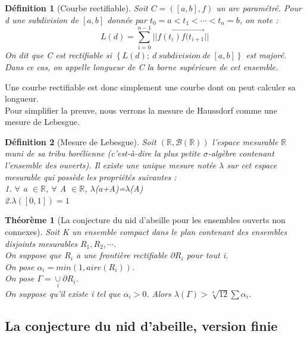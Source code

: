 \documentclass{book}
\newtheorem{theorem}{Théorème}
\newtheorem{definition}{Définition}
\begin{document}
\begin{definition}[Courbe rectifiable]
Soit $C = ([a, b], f)$ un arc paramétré. Pour d une subdivision de $[a, b]$ donnée par $t_0 = a < t_1 < \cdots < t_n = b$, on note :
$$L(d) = \underset{i=0}{\overset{n-1}{\sum}} ||\overrightarrow{f(t_i)f(t_{i+1}}||$$
On dit que C est rectifiable si $\left\{ L(d) ;~d~subdivision~de~[a,b] \right\}$ est majoré.\\
Dans ce cas, on appelle longueur de C la borne supérieure de cet ensemble.

\end{definition}

{\noindent Une courbe rectifiable est donc simplement une courbe dont on peut calculer sa longueur.}\\
Pour simplifier la preuve, nous verrons la mesure de Haussdorf comme une mesure de Lebesgue.

\begin{definition}[Mesure de Lebesgue]
Soit $(\mathbb{R},\mathcal{B(\mathbb{R})})$ l'espace mesurable $\mathbb{R}$ muni de sa tribu borélienne (c'est-à-dire la plus petite $\sigma$-algèbre contenant l'ensemble des ouverts). Il existe une unique mesure notée $\lambda$ sur cet espace mesurable qui possède les propriétés suivantes :\\
1. $\forall$ a $\in \mathbb{R}$, $\forall$ A $\in \mathbb{R}$, $\lambda$(a+A)=$\lambda$(A)\\
2.$\lambda([0,1])=1$
\end{definition}

\begin{tcolorbox}[colback=green!6]
\begin{theorem}[La conjecture du nid d'abeille pour les ensembles ouverts non connexes]
Soit K un ensemble compact dans le plan contenant des ensembles disjoints mesurables $R_1, R_2, \cdots$. \\
On suppose que $R_i$ a une frontière rectifiable $\partial R_i$ pour tout i. \\
On pose $\alpha _i = min(1, aire(R_i))$. \\ 
On pose $\Gamma = \underset{i}{\cup} \partial R_i$. \\
On suppose  qu'il existe i tel que $\alpha _i >0$. 
Alors $\lambda(\Gamma) > \sqrt[4]{12} \sum \alpha _i$.

\end{theorem}
\end{tcolorbox}

\subsection{La conjecture du nid d'abeille, version finie}
\end{document}
